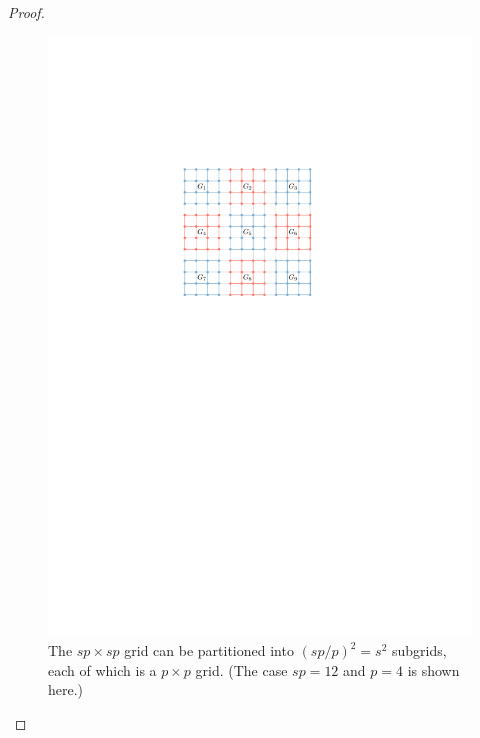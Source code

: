\documentclass{patmorin}
\theoremstyle{plain}
\theoremstyle{definition}
\begin{document}
\begin{proof}
  \begin{figure}
    \begin{center}
      \includegraphics{gridlayout}
    \end{center}
    \caption{The $sp\times sp$ grid can be partitioned into $(sp/p)^2 = s^2$ subgrids, each of which is a $p\times p$ grid. (The case $sp=12$ and $p=4$ is shown here.)}
    \label{grid_partition}
  \end{figure}


\end{proof}
\end{document}
